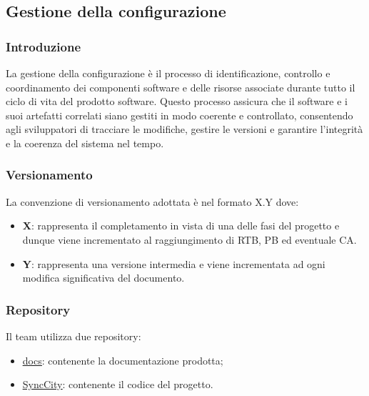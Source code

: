 
\subsection{Gestione della configurazione}
\subsubsection{Introduzione}
La gestione della configurazione è il processo di identificazione, controllo e coordinamento dei componenti software e delle risorse associate durante tutto il ciclo di vita del prodotto software. Questo processo assicura che il software e i suoi artefatti correlati siano gestiti in modo coerente e controllato, consentendo agli sviluppatori di tracciare le modifiche, gestire le versioni e garantire l'integrità e la coerenza del sistema nel tempo.
\newpage
\subsubsection{Versionamento}
La convenzione di versionamento adottata è nel formato X.Y dove:
\begin{itemize}
	\item \textbf{X}: rappresenta il completamento in vista di una delle fasi del progetto e dunque viene incrementato al raggiungimento di RTB, PB ed eventuale CA.
	\item \textbf{Y}: rappresenta una versione intermedia e viene incrementata ad ogni modifica significativa del documento.
\end{itemize}

\subsubsection{Repository}
Il team utilizza due repository:
\begin{itemize}
	\item \href{https://github.com/7Last/docs.git}{\underline{docs}}: contenente la documentazione prodotta;
	\item \href{https://github.com/7Last/SyncCity}{\underline{SyncCity}}: contenente il codice del progetto.
\end{itemize}

